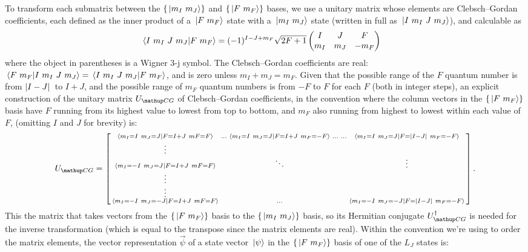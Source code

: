 To transform each submatrix between the $\{\ket{m_I\ m_J}\}$ and $\{\ket{F\ m_F}\}$ bases, we use a unitary matrix whose elements are Clebsch--Gordan coefficients, each defined as the inner product of a $\ket{F\ m_F}$ state with a $\ket{m_I\ m_J}$ state (written in full as $\ket{I\ m_I\ J\ m_J}$), and calculable as \cite{steck_rubidium_2015}
\begin{align}\label{eq:ClebschGordanCoeffs}
\braket{I\ m_I\ J\ m_J}{F\ m_F} &=
(-1)^{I - J + m_F}\sqrt{2F + 1}
\left(\begin{matrix}
I & J & F\\
m_I & m_J & -m_F\\
\end{matrix}\right)
\end{align}
where the object in parentheses is a Wigner $3$-j symbol. The Clebsch--Gordan coefficients are real: $\braket{F\ m_F}{I\ m_I\ J\ m_J} = \braket{I\ m_I\ J\ m_J}{F\ m_F}$, and is zero unless $m_I + m_J = m_F$.
Given that the possible range of the $F$ quantum number is from $\abs{I - J}$ to $I + J$, and the possible range of $m_F$ quantum numbers is from $-F$ to $F$ for each $F$ (both in integer steps), an explicit construction of the unitary matrix $U_\up{CG}$ of Clebsch--Gordan coefficients, in the convention where the column vectors in the $\{\ket{F\ m_F}\}$ basis have $F$ running from its highest value to lowest from top to bottom, and $m_F$ also running from highest to lowest within each value of $F$, (omitting $I$ and $J$ for brevity) is:
\begin{align}
U_\up{CG} = \left[\begin{smallmatrix}
\braket{m_I=I\ m_J=J}{F=I+J\ mF=F} & \hdots &
\braket{m_I=I\ m_J=J}{F=I+J\ m_F=-F} & \hdots &\hdots &
\braket{m_I=I\ m_J=J}{F=\abs{I - J}\ m_F=-F}\\
\vdots\\
\braket{m_I=-I\ m_J=J}{F=I+J\ mF=F} & & \ddots & & & \vdots\\
\vdots\\
\vdots\\
\braket{m_I=-I\ m_J=-J}{F=I+J\ mF=F} & & \hdots & & &
\braket{m_I=-I\ m_J=-J}{F=\abs{I - J}\ m_F=-F}\\
\end{smallmatrix}\right].
\end{align}
This the matrix that takes vectors from the $\{\ket{F\ m_F}\}$ basis to the $\{\ket{m_I\ m_J}\}$ basis, so its Hermitian conjugate $U^\dagger_\up{CG}$ is needed for the inverse transformation (which is equal to the transpose since the matrix elements are real). Within the convention we're using to order the matrix elements, the vector representation $\vec\psi$ of a state vector $\ket{\psi}$ in the $\{\ket{F\ m_F}\}$ basis of one of the $L_J$ states is:
